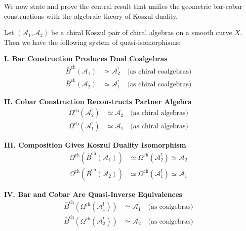We now state and prove the central result that unifies the geometric bar-cobar constructions 
with the algebraic theory of Koszul duality.

\begin{theorem}
\label{thm:bar-cobar-isomorphism-main}
Let $(\mathcal{A}_1, \mathcal{A}_2)$ be a chiral Koszul pair of chiral algebras on a 
smooth curve $X$. Then we have the following system of quasi-isomorphisms:

\medskip
\noindent\textbf{I. Bar Construction Produces Dual Coalgebras}
\begin{align}
\bar{B}^{\text{ch}}(\mathcal{A}_1) &\simeq \mathcal{A}_2^! \quad 
   \text{(as chiral coalgebras)} \label{eq:bar-A1-is-A2-dual} \\
\bar{B}^{\text{ch}}(\mathcal{A}_2) &\simeq \mathcal{A}_1^! \quad 
   \text{(as chiral coalgebras)} \label{eq:bar-A2-is-A1-dual}
\end{align}

\medskip
\noindent\textbf{II. Cobar Construction Reconstructs Partner Algebra}
\begin{align}
\Omega^{\text{ch}}(\mathcal{A}_2^!) &\simeq \mathcal{A}_2 \quad 
   \text{(as chiral algebras)} \label{eq:cobar-A2-dual-is-A2} \\
\Omega^{\text{ch}}(\mathcal{A}_1^!) &\simeq \mathcal{A}_1 \quad 
   \text{(as chiral algebras)} \label{eq:cobar-A1-dual-is-A1}
\end{align}

\medskip
\noindent\textbf{III. Composition Gives Koszul Duality Isomorphism}
\begin{align}
\Omega^{\text{ch}}(\bar{B}^{\text{ch}}(\mathcal{A}_1)) &\simeq 
   \Omega^{\text{ch}}(\mathcal{A}_2^!) \simeq \mathcal{A}_2 
   \label{eq:composition-A1-to-A2} \\
\Omega^{\text{ch}}(\bar{B}^{\text{ch}}(\mathcal{A}_2)) &\simeq 
   \Omega^{\text{ch}}(\mathcal{A}_1^!) \simeq \mathcal{A}_1
   \label{eq:composition-A2-to-A1}
\end{align}

\medskip
\noindent\textbf{IV. Bar and Cobar Are Quasi-Inverse Equivalences}
\begin{align}
\bar{B}^{\text{ch}}(\Omega^{\text{ch}}(\mathcal{A}_1^!)) &\simeq \mathcal{A}_1^! 
   \quad \text{(as coalgebras)} \\
\bar{B}^{\text{ch}}(\Omega^{\text{ch}}(\mathcal{A}_2^!)) &\simeq \mathcal{A}_2^! 
   \quad \text{(as coalgebras)}
\end{align}
\end{theorem}

